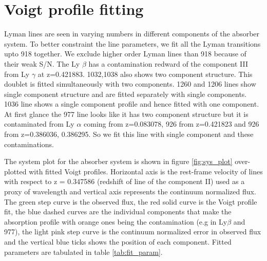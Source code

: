 \section{Voigt profile fitting} \label{sec:Voigt_fitting}

Lyman lines are seen in varying numbers in different components of the absorber system. To better constraint the line parameters, we fit all the Lyman transitions upto  918 together. We exclude higher order Lyman lines than  918 because of their weak S/N. The Ly $\beta$ has a contamination redward of the component III from Ly $\gamma$ at z=0.421883.  1032,1038 also shows two component structure. This doublet is fitted simultaneously with two components.  1260 and  1206 lines show single component structure and are fitted separately with single components.  1036 line shows a single component profile and hence fitted with one component. At first glance the  977 line looks like it has two component structure but it is contaminated from Ly $\alpha$ coming from z=0.083078,  926 from z=0.421823 and  926 from z=0.386036, 0.386295. So we fit this line with single  component and these contaminations. 

The system plot for the absorber system is shown in figure \ref{fig:sys_plot} over-plotted with fitted Voigt profiles. Horizontal axis is the rest-frame velocity of lines with respect to z = 0.347586 (redshift of  line of the component II) used as a proxy of wavelength and vertical axis represents the continuum normalized flux. The green step curve is the observed flux, the red solid curve is the Voigt profile fit, the blue dashed curves are the individual components that make the absorption profile with orange ones being the contamination (e.g in Ly$\beta$ and  977), the light pink step curve is the continuum normalized error in observed flux and the vertical blue ticks shows the position of each component. Fitted parameters are tabulated in table \ref{tab:fit_param}.

